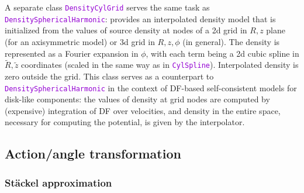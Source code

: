 \documentclass[12pt]{article}
\newcommand{\ttt}[1]{\textcolor{darkviolet}{\texttt{#1}}}
\begin{document}
\label{sec:DensityCylGrid} A separate class \ttt{DensityCylGrid} serves the same task as \ttt{DensitySphericalHarmonic}: provides an interpolated density model that is initialized from the values of source density at nodes of a 2d grid in $R,z$ plane (for an axisymmetric model) or 3d grid in $R,z,\phi$ (in general). The density is represented as a Fourier expansion in $\phi$, with each term being a 2d cubic spline in $\tilde R, \tilde z$ coordinates (scaled in the same way as in \ttt{CylSpline}). Interpolated density is zero outside the grid. This class serves as a counterpart to \ttt{DensitySphericalHarmonic} in the context of DF-based self-consistent models for disk-like components: the values of density at grid nodes are computed by (expensive) integration of DF over velocities, and density in the entire space, necessary for computing the potential, is given by the interpolator.


\subsection{Action/angle transformation}  \label{sec:ActionsDetails}
\subsubsection{St\"ackel approximation}  \label{sec:ActionsStaeckelDetails}
\end{document}
